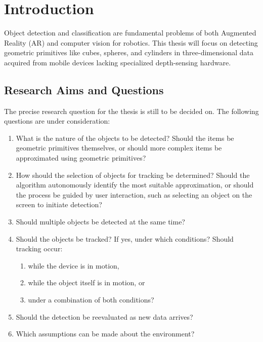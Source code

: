 
\chapter{Introduction}
Object detection and classification are fundamental problems of both Augmented Reality (AR) and computer vision for robotics.
This thesis will focus on detecting geometric primitives like cubes, spheres, and cylinders in three-dimensional data acquired from mobile devices lacking specialized depth-sensing hardware.


\section{Research Aims and Questions}

The precise research question for the thesis is still to be decided on.
The following questions are under consideration:
\begin{enumerate}
    \item What is the nature of the objects to be detected? Should the items be geometric primitives themselves, or should more complex items be approximated using geometric primitives?
    \item How should the selection of objects for tracking be determined? Should the algorithm autonomously identify the most suitable approximation, or should the process be guided by user interaction, such as selecting an object on the screen to initiate detection?
    \item Should multiple objects be detected at the same time?
    \item Should the objects be tracked? If yes, under which conditions? Should tracking occur:
    \begin{enumerate}
        \item while the device is in motion,
        \item while the object itself is in motion, or
        \item under a combination of both conditions?
    \end{enumerate}
    \item Should the detection be reevaluated as new data arrives?
    \item Which assumptions can be made about the environment?
\end{enumerate}